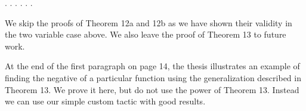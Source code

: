 \documentclass[11pt,twocolumn]{article}
\begin{document}
\begin{coqdoccode}
\coqdocindent{4.00em}
   .\coqdoceol
\coqdocnoindent
{}.\coqdoceol
\coqdocindent{1.00em}
  .\coqdoceol
\coqdocindent{1.00em}
 .\coqdoceol
\coqdocindent{1.00em}
  .\coqdoceol
\coqdocnoindent
{}.\coqdoceol
\coqdocemptyline
\end{coqdoccode}


We skip the proofs of Theorem 12a and 12b as we have shown their
validity in the two variable case above.  We also leave the proof of
Theorem 13 to future work.


\begin{coqdoccode}
\coqdocemptyline
\coqdocemptyline
\end{coqdoccode}


At the end of the first paragraph on page 14, the thesis illustrates
an example of finding the negative of a particular function using the
generalization described in Theorem 13.  We prove it here, but do not
use the power of Theorem 13.  Instead we can use our simple custom
tactic with good results.
\end{document}
